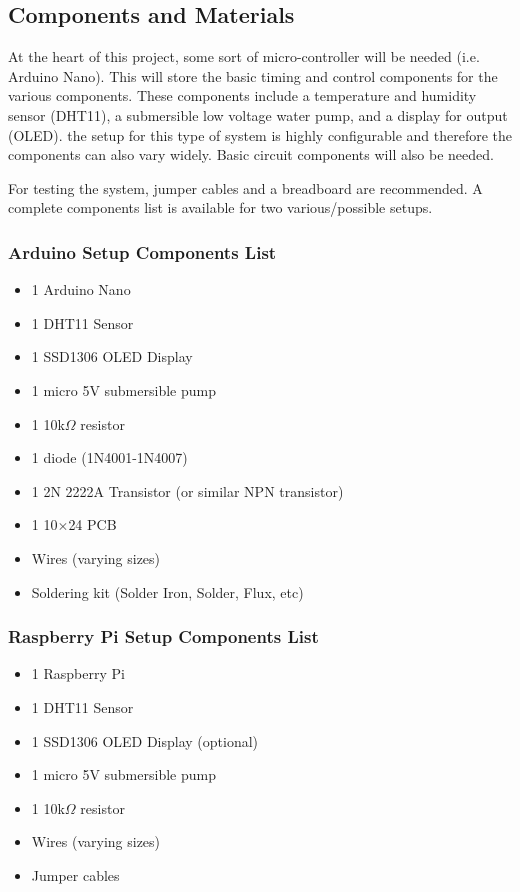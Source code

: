 \documentclass{article}
\begin{document}
	\begin{multicols}{2} %
		
		\section{Components and Materials}
		
		At the heart of this project, some sort of micro-controller will be needed (i.e. Arduino Nano). This will store the basic timing and control components for the various components. These components include a temperature and humidity sensor (DHT11), a submersible low voltage water pump, and a display for output (OLED). the setup for this type of system is highly configurable and therefore the components can also vary widely. Basic circuit components will also be needed.
		
		For testing the system, jumper cables and a breadboard are recommended. A complete components list is available for two various/possible setups.
		
		\subsubsection{Arduino Setup Components List}
		\begin{itemize}[itemsep=1pt, parsep=1pt]
			\item 1 Arduino Nano
			\item 1 DHT11 Sensor
			\item 1 SSD1306 OLED Display
			\item 1 micro 5V submersible pump
			\item 1 10k$\Omega$ resistor
			\item 1 diode (1N4001-1N4007)
			\item 1 2N 2222A Transistor (or similar NPN transistor)
			\item 1 10$\times$24 PCB
			\item Wires (varying sizes)
			\item Soldering kit (Solder Iron, Solder, Flux, etc)
		\end{itemize}
		
		\subsubsection{Raspberry Pi Setup Components List}
		\begin{itemize}[itemsep=1pt, parsep=1pt]
			\item 1 Raspberry Pi
			\item 1 DHT11 Sensor
			\item 1 SSD1306 OLED Display (optional)
			\item 1 micro 5V submersible pump
			\item 1 10k$\Omega$ resistor
			\item Wires (varying sizes)
			\item Jumper cables
		\end{itemize}
		

\end{multicols}
\end{document}
